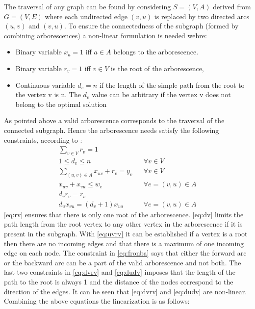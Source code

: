 \documentclass[msthesis.tex]{subfiles}
\begin{document}
The traversal of any graph can be found by considering $S = (V,A)$ derived from $G=(V,E)$  where each undirected edge $(v,u)$ is replaced by two directed arcs $(u,v)$ and $(v,u)$. To ensure the connectedness of the subgraph (formed by combining arborescences) a non-linear formulation is needed wehre:
\begin{itemize}
     \setlength\itemsep{0.5em}
    \item Binary variable $x_a = 1$ iff $a \in A$ belongs to the arborescence.
    \item Binary variable $r_v = 1$ iff $v \in V$ is the root of the arborescence,
    \item Continuous variable $d_v = n$ if the length of the simple path from the root to the vertex v is n. The $d_v$ value can be arbitrary if the vertex v does not belong to the optimal solution
\end{itemize}
As pointed above a valid arborescence corresponds to the traversal of the connected subgraph. Hence the arborescence needs satisfy the following constraints, according to \cite{haouari2013enhanced}:
\begin{align}
    \label{eq:rv}
    \sum_{v \in V} r_v = 1\\
    \label{eq:dv}
    1 \leq d_v \leq n && \forall v \in V \\
    \label{eq:uvrv}
    \sum_{(u,v) \in A} x_{uv} + r_v = y_v && \forall v \in V\\
    \label{eq:fronba}
    x_{uv} + x_{vu} \leq w_e && \forall e =(v,u) \in A\\
    \label{eq:dvrv}
    d_v r_v = r_v\\
    \label{eq:dudv}
    d_u x_{vu} = (d_v + 1) x_{vu} && \forall e=(v, u) \in A
\end{align}
 \autoref{eq:rv} ensures that there is only one root of the arborescence. \autoref{eq:dv} limits the path length from the root vertex to any other vertex in the arborescence if it is present in the subgraph. With \autoref{eq:uvrv} it can be established if a vertex is a root then there are no incoming edges and that there is a maximum of one incoming edge on each node. The constraint in \autoref{eq:fronba} says that either the forward arc or the backward arc can be a part of the valid arborescence and not both. The last two constraints in \autoref{eq:dvrv}  and \autoref{eq:dudv} imposes that the length of the path to the root is always 1 and the distance of the nodes correspond to the direction of the edges.
It can be seen that  \autoref{eq:dvrv} and \autoref{eq:dudv} are non-linear. Combining the above equations the linearization is as follows:
\end{document}

